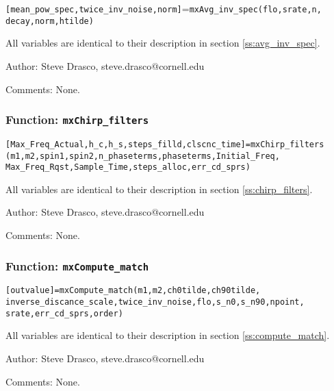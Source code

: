 \texttt{[mean\_pow\_spec,twice\_inv\_noise,norm]}=\texttt{mxAvg\_inv\_spec(flo,srate,n,}
\texttt{decay,norm,htilde)}

All variables are identical to their description in section \ref{ss:avg_inv_spec}.

\begin{description}
\item{Author:} Steve Drasco, steve.drasco@cornell.edu
\item{Comments:} None.
\end{description}

\subsubsection{Function: {\tt mxChirp\_filters}}
\label{sss:mxChirp_filters}

\texttt{[Max\_Freq\_Actual,h\_c,h\_s,steps\_filld,clscnc\_time]=mxChirp\_filters} \\
\texttt{(m1,m2,spin1,spin2,n\_phaseterms,phaseterms,Initial\_Freq,} \\
\texttt{Max\_Freq\_Rqst,Sample\_Time,steps\_alloc,err\_cd\_sprs)}

All variables are identical to their description in section \ref{ss:chirp_filters}.

\begin{description}
\item{Author:} Steve Drasco, steve.drasco@cornell.edu
\item{Comments:} None.
\end{description}

\subsubsection{Function: {\tt mxCompute\_match}}
\label{sss:mxCompute_match}

\texttt{[outvalue]=mxCompute\_match(m1,m2,ch0tilde,ch90tilde,} \\
\texttt{inverse\_discance\_scale,twice\_inv\_noise,flo,s\_n0,s\_n90,npoint,} \\
\texttt{srate,err\_cd\_sprs,order)}

All variables are identical to their description in section \ref{ss:compute_match}.

\begin{description}
\item{Author:} Steve Drasco, steve.drasco@cornell.edu
\item{Comments:} None.
\end{description}

